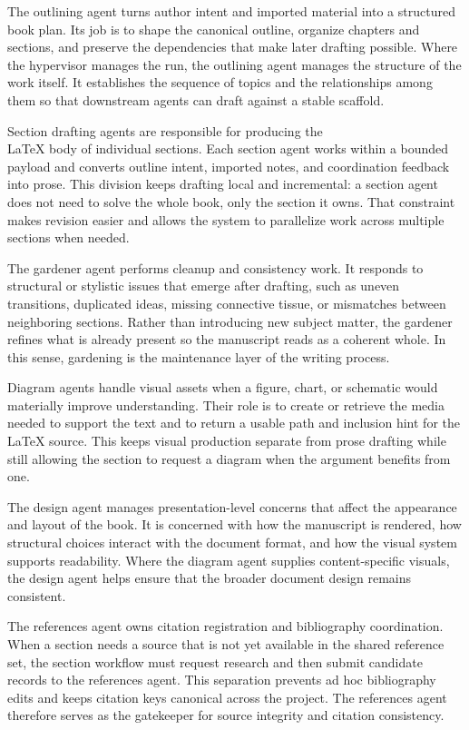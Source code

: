 \documentclass[11pt]{article}
\begin{document}
The outlining agent turns author intent and imported material into a structured book plan. Its job is to shape the canonical outline, organize chapters and sections, and preserve the dependencies that make later drafting possible. Where the hypervisor manages the run, the outlining agent manages the structure of the work itself. It establishes the sequence of topics and the relationships among them so that downstream agents can draft against a stable scaffold.

Section drafting agents are responsible for producing the \\LaTeX{} body of individual sections. Each section agent works within a bounded payload and converts outline intent, imported notes, and coordination feedback into prose. This division keeps drafting local and incremental: a section agent does not need to solve the whole book, only the section it owns. That constraint makes revision easier and allows the system to parallelize work across multiple sections when needed.

The gardener agent performs cleanup and consistency work. It responds to structural or stylistic issues that emerge after drafting, such as uneven transitions, duplicated ideas, missing connective tissue, or mismatches between neighboring sections. Rather than introducing new subject matter, the gardener refines what is already present so the manuscript reads as a coherent whole. In this sense, gardening is the maintenance layer of the writing process.

Diagram agents handle visual assets when a figure, chart, or schematic would materially improve understanding. Their role is to create or retrieve the media needed to support the text and to return a usable path and inclusion hint for the \\LaTeX{} source. This keeps visual production separate from prose drafting while still allowing the section to request a diagram when the argument benefits from one.

The design agent manages presentation-level concerns that affect the appearance and layout of the book. It is concerned with how the manuscript is rendered, how structural choices interact with the document format, and how the visual system supports readability. Where the diagram agent supplies content-specific visuals, the design agent helps ensure that the broader document design remains consistent.

The references agent owns citation registration and bibliography coordination. When a section needs a source that is not yet available in the shared reference set, the section workflow must request research and then submit candidate records to the references agent. This separation prevents ad hoc bibliography edits and keeps citation keys canonical across the project. The references agent therefore serves as the gatekeeper for source integrity and citation consistency.
\end{document}
